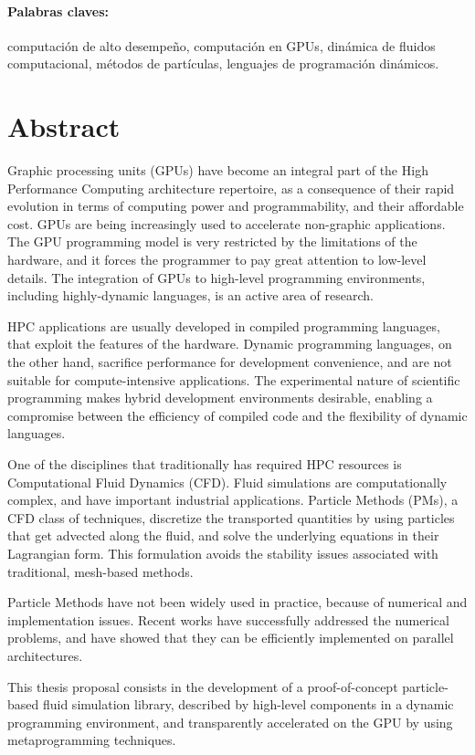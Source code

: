 \documentclass[11pt,spanish]{article}
\begin{document}
\paragraph{Palabras claves:}
computación de alto desempeño,
computación en GPUs,
dinámica de fluidos computacional,
métodos de partículas,
lenguajes de programación dinámicos.

\newpage
\section*{Abstract}
Graphic processing units (GPUs) have become an integral part of the High
Performance Computing architecture repertoire, as a consequence of their rapid
evolution in terms of computing power and programmability, and their affordable
cost.  GPUs are being increasingly used to accelerate non-graphic applications.
The GPU programming model is very restricted by the limitations of the hardware,
and it forces the programmer to pay great attention to low-level details.  The
integration of GPUs to high-level programming environments, including
highly-dynamic languages, is an active area of research.

HPC applications are usually developed in compiled programming languages, that
exploit the features of the hardware.  Dynamic programming languages, on the
other hand, sacrifice performance for development convenience, and are not
suitable for compute-intensive applications.  The experimental nature of
scientific programming makes hybrid development environments desirable, enabling
a compromise between the efficiency of compiled code and the flexibility of
dynamic languages.

One of the disciplines that traditionally has required HPC resources is
Computational Fluid Dynamics (CFD).  Fluid simulations are computationally
complex, and have important industrial applications.  Particle Methods (PMs), a
CFD class of techniques, discretize the transported quantities by using
particles that get advected along the fluid, and solve the underlying equations
in their Lagrangian form.  This formulation avoids the stability issues
associated with traditional, mesh-based methods.

Particle Methods have not been widely used in practice, because of numerical and
implementation issues.  Recent works have successfully addressed the numerical
problems, and have showed that they can be efficiently implemented on parallel
architectures.

This thesis proposal consists in the development of a proof-of-concept
particle-based fluid simulation library, described by high-level components in a
dynamic programming environment, and transparently accelerated on the GPU by
using metaprogramming techniques.
\end{document}
